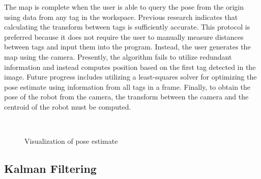\documentclass{article}
\begin{document}
    The map is complete when the user is able to query the pose from the origin using data from any tag in the workspace. Previous research indicates that calculating the transform between tags is sufficiently accurate. This protocol is preferred because it does not require the user to manually measure distances between tags and input them into the program. Instead, the user generates the map using the camera. Presently, the algorithm fails to utilize redundant information and instead computes position based on the first tag detected in the image. Future progress includes utilizing a least-squares solver for optimizing the pose estimate using information from all tags in a frame. Finally, to obtain the pose of the robot from the camera, the transform between the camera and the centroid of the robot must be computed.

    \begin{figure}[H]%
      \centering
      \qquad
      \\
      \caption{Visualization of pose estimate}%
      \label{fig:arucoVis}%
    \end{figure}

	\subsection{Kalman Filtering}
\end{document}
